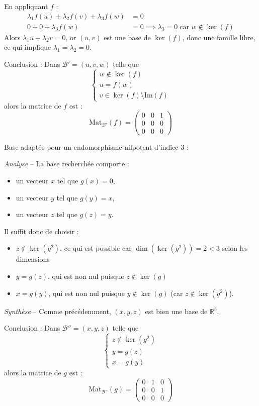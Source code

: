 \documentclass[10pt,a4paper]{article}
\begin{document}
En appliquant \(f\) :
\[
\begin{aligned}
    \lambda_1 f(u) + \lambda_2 f(v) + \lambda_3 f(w) & = 0\\
    0 + 0 + \lambda_3 f(w) & = 0 \implies \lambda_3 = 0 \; \text{car \(w \notin \ker(f)\)}
\end{aligned}
\]
Alors \(\lambda_1 u + \lambda_2 v = 0\), or \((u,v)\) est
une base de \(\ker(f)\), donc une famille libre, ce qui implique \(\lambda_1 = \lambda_2 = 0\).

Conclusion : Dans \(\mathcal{B}' = (u,v, w)\) telle que
\[
\begin{cases}
w \notin \ker(f)\\
u = f(w)\\
v \in \ker(f) \setminus \mathrm{Im}(f)
\end{cases}
\] alors la matrice de \(f\) est :
\[
\mathrm{Mat}_{\mathcal{B}'}(f) =
\begin{pmatrix}
0 & 0 & 1 \\
0 & 0 & 0 \\
0 & 0 & 0
\end{pmatrix}
\]

\q Base adaptée pour un endomorphisme nilpotent d'indice 3 :

\textit{Analyse} -- La base recherchée comporte :
\begin{itemize}
 \item un vecteur \(x\) tel que \(g(x) = 0\),
 \item un vecteur \(y\) tel que \(g(y) = x\),
 \item un vecteur \(z\) tel que \(g(z) = y\).
\end{itemize}
Il suffit donc de choisir  :
\begin{itemize}
 \item \(z \notin \ker(g^2)\), ce qui est possible car \(\dim(\ker(g^2)) = 2 < 3\) selon les dimensions
 \item \(y = g(z)\), qui est non nul puisque \(z \notin \ker(g)\)
 \item \(x = g(y)\), qui est non nul puisque \(y \notin \ker(g)\) (car \(z
 \notin \ker(g^2)\)).
\end{itemize}

\medskip
\textit{Synthèse} -- Comme précédemment, \((x,y, z)\) est bien une base de
\(\mathbb{R}^3\).

Conclusion : Dans \(\mathcal{B}'' = (x,y, z)\) telle que
\[
\begin{cases}
z \notin \ker(g^2)\\
y = g(z)\\
x = g(y)
\end{cases}
\]
alors la matrice de \(g\) est :
\[
\mathrm{Mat}_{\mathcal{B}''}(g) =
\begin{pmatrix}
0 & 1 & 0 \\
0 & 0 & 1 \\
0 & 0 & 0
\end{pmatrix}
\]
\end{document}
